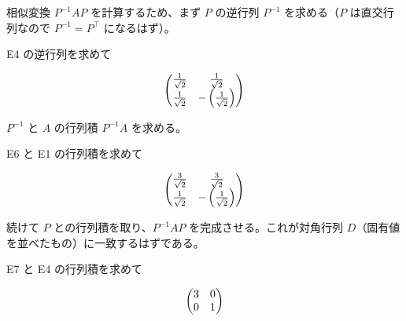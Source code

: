 \documentclass[dvipdfmx,a4paper,11pt]{jsarticle}
\begin{document}
相似変換 $P^{-1}AP$ を計算するため、まず $P$ の逆行列 $P^{-1}$ を求める（$P$ は直交行列なので $P^{-1}=P^\top$ になるはず）。

E4 の逆行列を求めて

\begin{equation}
  \ifx\endpmatrix\undefined\pmatrix{\else\begin{pmatrix}\fi \frac{1}{\sqrt{2}}&\frac{1}{\sqrt{2}}\cr \frac{1}{\sqrt{2}}&-\left(\frac{1}{\sqrt{2}}\right)\cr \ifx\endpmatrix\undefined}\else\end{pmatrix}\fi
  \label{eq:E6}
\end{equation}

$P^{-1}$ と $A$ の行列積 $P^{-1}A$ を求める。

E6 と E1 の行列積を求めて

\begin{equation}
  \ifx\endpmatrix\undefined\pmatrix{\else\begin{pmatrix}\fi \frac{3}{\sqrt{2}}&\frac{3}{\sqrt{2}}\cr \frac{1}{\sqrt{2}}&-\left(\frac{1}{\sqrt{2}}\right)\cr \ifx\endpmatrix\undefined}\else\end{pmatrix}\fi
  \label{eq:E7}
\end{equation}

続けて $P$ との行列積を取り、$P^{-1}AP$ を完成させる。これが対角行列 $D$（固有値を並べたもの）に一致するはずである。

E7 と E4 の行列積を求めて

\begin{equation}
  \ifx\endpmatrix\undefined\pmatrix{\else\begin{pmatrix}\fi 3&0\cr 0&1\cr \ifx\endpmatrix\undefined}\else\end{pmatrix}\fi
  \label{eq:E8}
\end{equation}
\end{document}
